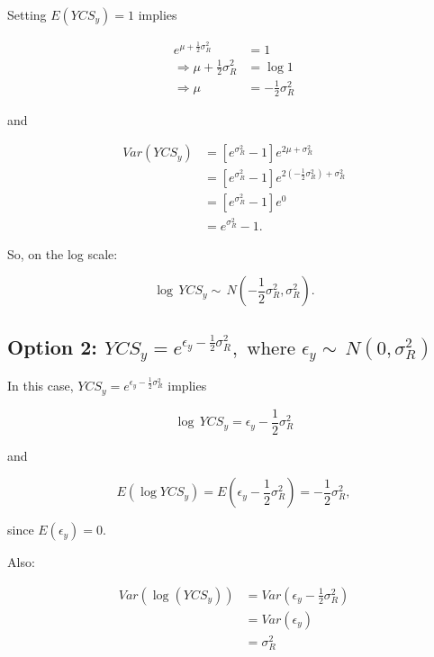 \begin{appendices}
Setting \(E(YCS_y) = 1\) implies

\begin{align}
e^{\mu + \frac{1}{2}\sigma^2_R} &= 1 \nonumber \\
\Rightarrow  \mu + \frac{1}{2}\sigma^2_R &= \log 1 \nonumber \\
\Rightarrow \mu &= -\frac{1}{2}\sigma^2_R
\label{musolve}
\end{align}

and

\begin{align}
Var(YCS_y) &= \left[e^{\sigma^2_R}-1\right]e^{2\mu + \sigma^2_R} \nonumber \\
&= \left[e^{\sigma^2_R}-1\right]e^{2(-\frac{1}{2}\sigma^2_R) + \sigma^2_R} \nonumber \\
&=\left[e^{\sigma^2_R}-1\right]e^0 \nonumber \\
&= e^{\sigma^2_R}-1.
\end{align}

So, on the log scale:

\[\log\, YCS_y \sim \,N\left(-\frac{1}{2}\sigma^2_R, \sigma^2_R\right).\]

\subsection*{\texorpdfstring{Option 2:
		\(YCS_y = e^{\epsilon_y - \frac{1}{2}\sigma^2_R},\,\, \text{where } \epsilon_y \sim \,N(0, \sigma^2_R)\)}{1.2 Option 2: YCS\_y = e\^{}\{\textbackslash{}epsilon\_y - \textbackslash{}frac\{1\}\{2\}\textbackslash{}sigma\^{}2\_R\},\textbackslash{},\textbackslash{}, \textbackslash{}text\{where \} \textbackslash{}epsilon\_y \textbackslash{}sim \textbackslash{},N(0, \textbackslash{}sigma\^{}2\_R)}}\label{option-2-ycs_y-eepsilon_y---frac12sigma2_r-textwhere-epsilon_y-sim-n0-sigma2_r}

In this case, \(YCS_y = e^{\epsilon_y - \frac{1}{2}\sigma^2_R}\) implies

\[\log\, YCS_y = \epsilon_y - \frac{1}{2}\sigma^2_R\]

and

\[E(\log YCS_y) = E\left(\epsilon_y - \frac{1}{2}\sigma^2_R\right) = -\frac{1}{2}\sigma^2_R,\]

since \(E(\epsilon_y) =0\).

Also:

\begin{align}
Var(\log(YCS_y)) &= Var\left(\epsilon_y - \frac{1}{2}\sigma^2_R\right) \nonumber\\
&=Var(\epsilon_y)\nonumber \\
&=\sigma^2_R
\end{align}


\end{appendices}
